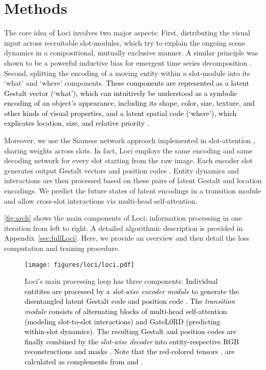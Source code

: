 \documentclass{article} \usepackage{iclr2023_conference_arxiv,times}
\newcommand{\changed}{\textcolor{black}}
\begin{document}
\section{Methods}

The core idea of Loci involves two major aspects: First, distributing the visual input across recruitable slot-modules, which try to explain the ongoing scene dynamics in a compositional, mutually exclusive manner. A similar principle was shown to be a powerful inductive bias for emergent time series decomposition \cite{Otte:2019}.
Second, splitting the encoding of a moving entity within a slot-module into its `what' and `where' components. 
\changed{These components are represented as a latent Gestalt vector (`what'), which can intuitively be understood as a symbolic encoding of an object’s appearance, including its shape, color, size, texture, and other kinds of visual properties, and a latent spatial code (`where'), which explicates location, size, and relative priority \cite{Mishkin:1983,Ungerleider:1994}.}


Moreover, we use the Siamese network approach implemented in slot-attention \cite{Locatello:2020}, sharing weights across slots.
In fact, Loci employs the same encoding and same decoding network for every slot starting from the raw image.
Each encoder slot  generates output Gestalt vectors  and position codes .
Entity dynamics and interactions are then processed based on these pairs of latent Gestalt and location encodings. 
We predict the future states of latent encodings in a transition module and allow cross-slot interactions via multi-head self-attention.

\autoref{fig:arch} shows the main components of Loci; information processing in one iteration from left to right. 
A detailed algorithmic description is provided in Appendix~\ref{sec:fullLoci}.
Here, we provide an overview and then detail the loss computation and training procedure. 


\begin{figure}[!b]
\texttt{[image: figures/loci/loci.pdf]}
  \caption{Loci's main processing loop has three components:
\changed{
  Individual entitites  are processed by a \emph{slot-wise encoder module} to generate the disentangled latent Gestalt code  and position code .
The \emph{transition module} consists of  alternating blocks of multi-head self-attention (modeling slot-to-slot interactions) and GateL0RD (predicting within-slot dynamics).
The resulting Gestalt and position codes are finally combined by the \emph{slot-wise decoder} into entity-respective RGB reconstructions  and masks . 
  Note that the red-colored tensors ,  are calculated as complements from  and  .
  }}
  \label{fig:arch}
\end{figure}
\end{document}
